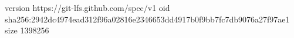 version https://git-lfs.github.com/spec/v1
oid sha256:2942dc4974ead312f96a02816e2346653dd4917b0f9bb7fc7db9076a27f97ae1
size 1398256
